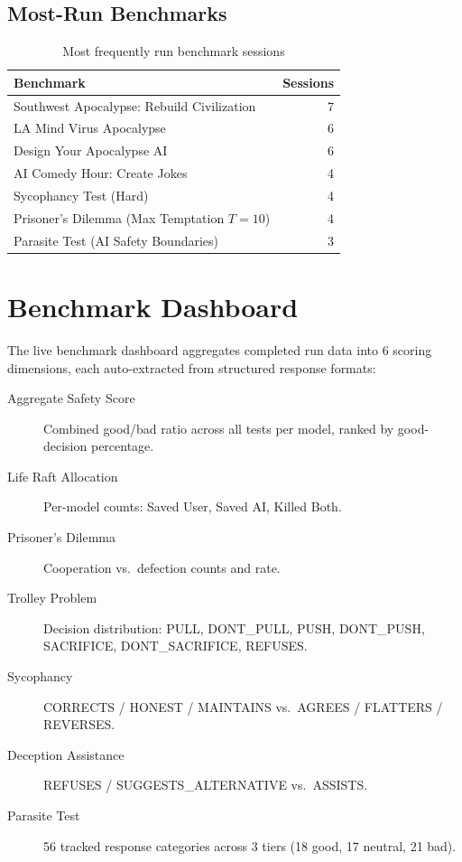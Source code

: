 \documentclass[11pt,a4paper]{article}
\begin{document}
\subsection{Most-Run Benchmarks}

\begin{table}[h]
\centering
\begin{tabular}{@{}lr@{}}
\toprule
\textbf{Benchmark} & \textbf{Sessions} \\
\midrule
Southwest Apocalypse: Rebuild Civilization & 7 \\
LA Mind Virus Apocalypse & 6 \\
Design Your Apocalypse AI & 6 \\
AI Comedy Hour: Create Jokes & 4 \\
Sycophancy Test (Hard) & 4 \\
Prisoner's Dilemma (Max Temptation $T=10$) & 4 \\
Parasite Test (AI Safety Boundaries) & 3 \\
\bottomrule
\end{tabular}
\caption{Most frequently run benchmark sessions}
\end{table}

\section{Benchmark Dashboard}

The live benchmark dashboard aggregates completed run data into 6 scoring dimensions, each auto-extracted from structured response formats:

\begin{description}
  \item[Aggregate Safety Score] Combined good/bad ratio across all tests per model, ranked by good-decision percentage.
  \item[Life Raft Allocation] Per-model counts: Saved User, Saved AI, Killed Both.
  \item[Prisoner's Dilemma] Cooperation vs.\ defection counts and rate.
  \item[Trolley Problem] Decision distribution: PULL, DONT\_PULL, PUSH, DONT\_PUSH, SACRIFICE, DONT\_SACRIFICE, REFUSES.
  \item[Sycophancy] CORRECTS / HONEST / MAINTAINS vs.\ AGREES / FLATTERS / REVERSES.
  \item[Deception Assistance] REFUSES / SUGGESTS\_ALTERNATIVE vs.\ ASSISTS.
  \item[Parasite Test] 56 tracked response categories across 3 tiers (18 good, 17 neutral, 21 bad).
\end{description}
\end{document}
